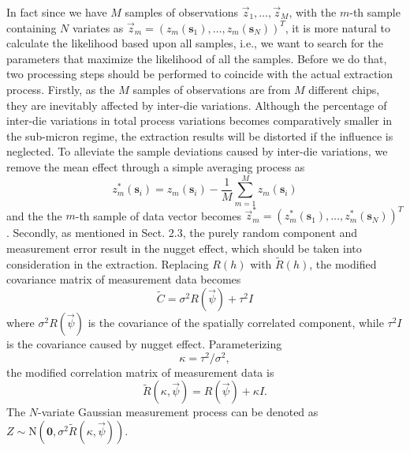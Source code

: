 \documentclass[referee]{ieice}
\begin{document}
In fact since we have $M$ samples of observations $\vec{z}_1,\ldots,\vec{z}_M$, with the $m$-th sample
containing $N$ variates as $\vec{z}_m=(z_m(\mathbf{s}_1),\ldots,z_m(\mathbf{s}_N))^T$, it is more natural
to calculate the likelihood based upon all samples, i.e., we want to search for the parameters that
maximize the likelihood of all the samples.
Before we do that, two processing steps should be performed to coincide with the actual extraction process.
Firstly, as the $M$ samples of observations are from $M$ different chips,
they are inevitably affected by inter-die variations.
Although the percentage of inter-die variations in total process variations becomes comparatively smaller
in the sub-micron regime, the extraction results will be distorted if the influence is neglected.
To alleviate the sample deviations caused by inter-die variations, we remove the mean effect through
a simple averaging process as
\begin{equation}
z_m^*(\mathbf{s}_i)=z_m(\mathbf{s}_i) - \frac{1}{M}\sum_{m=1}^M z_m(\mathbf{s}_i)
\end{equation}
and the the $m$-th sample of data vector becomes
$\vec{z}_m^*=(z_m^*(\mathbf{s}_1),\ldots, z_m^*(\mathbf{s}_N))^T$.
Secondly, as mentioned in Sect. 2.3, the purely random component and measurement error
result in the nugget effect, which should be taken into consideration in the extraction.
Replacing $R(h)$ with $\tilde{R}(h)$, the modified covariance matrix of measurement data becomes
\begin{equation}
\tilde{C}=\sigma^2 R(\vec{\psi})+\tau^2 I
\end{equation}
where $\sigma^2 R(\vec{\psi})$ is the covariance of
the spatially correlated component, while $\tau^2 I$ is the covariance caused by nugget effect.
Parameterizing
\begin{equation}
\kappa=\tau^2/\sigma^2,
\end{equation}
the modified correlation matrix of measurement data is
\begin{equation}
\tilde{R}(\kappa,\vec{\psi})=R(\vec{\psi})+\kappa I.
\end{equation}
The $N$-variate Gaussian measurement process can be denoted as
$Z\sim \mathrm{N}(\mathbf{0},\sigma^2 \tilde{R}(\kappa,\vec{\psi}))$.
\end{document}
